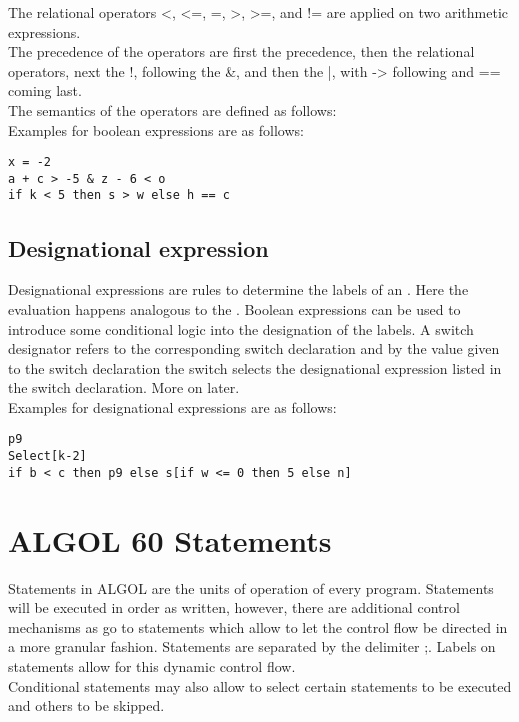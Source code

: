 \documentclass{article}
\begin{document}
The relational operators <, <=, =, >, >=, and != are applied on two arithmetic expressions. \\

The precedence of the operators are first the \label{arithexptypes} precedence, then the relational operators, next the !, following the \&, and then the |, with -\textgreater{} following and == coming last.\\
The semantics of the operators are defined as follows:\\
Examples for boolean expressions are as follows:\\

\begin{lstlisting}[language={[60]algol}]
x = -2
a + c > -5 & z - 6 < o
if k < 5 then s > w else h == c
\end{lstlisting}

\subsection{Designational expression} \label{desigExp}
Designational expressions are rules to determine the labels of an . Here the evaluation happens analogous to the . Boolean expressions can be used to introduce some conditional logic into the designation of the labels. A switch designator refers to the corresponding switch declaration and by the value given to the switch declaration the switch selects the designational expression listed in the switch declaration. More on  later.\\
Examples for designational expressions are as follows:\\

\begin{lstlisting}[language={[60]algol}]
p9
Select[k-2]
if b < c then p9 else s[if w <= 0 then 5 else n]
\end{lstlisting}

\newpage

\section{ALGOL 60 Statements} \label{statement}
Statements in ALGOL are the units of operation of every program. Statements will be executed in order as written, however, there are additional control mechanisms as go to statements which allow to let the control flow be directed in a more granular fashion. Statements are separated by the delimiter ;. Labels on statements allow for this dynamic control flow.\\
Conditional statements may also allow to select certain statements to be executed and others to be skipped.\\
\end{document}
